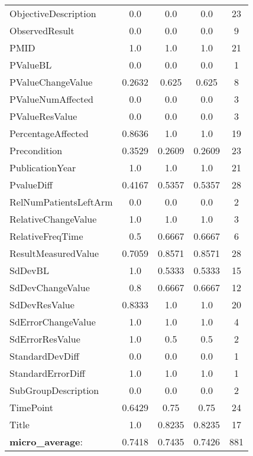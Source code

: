 \begin{longtable}{ l c c c c}
ObjectiveDescription & 0.0 & 0.0 & 0.0 & 23\\
ObservedResult & 0.0 & 0.0 & 0.0 & 9\\
PMID & 1.0 & 1.0 & 1.0 & 21\\
PValueBL & 0.0 & 0.0 & 0.0 & 1\\
PValueChangeValue & 0.2632 & 0.625 & 0.625 & 8\\
PValueNumAffected & 0.0 & 0.0 & 0.0 & 3\\
PValueResValue & 0.0 & 0.0 & 0.0 & 3\\
PercentageAffected & 0.8636 & 1.0 & 1.0 & 19\\
Precondition & 0.3529 & 0.2609 & 0.2609 & 23\\
PublicationYear & 1.0 & 1.0 & 1.0 & 21\\
PvalueDiff & 0.4167 & 0.5357 & 0.5357 & 28\\
RelNumPatientsLeftArm & 0.0 & 0.0 & 0.0 & 2\\
RelativeChangeValue & 1.0 & 1.0 & 1.0 & 3\\
RelativeFreqTime & 0.5 & 0.6667 & 0.6667 & 6\\
ResultMeasuredValue & 0.7059 & 0.8571 & 0.8571 & 28\\
SdDevBL & 1.0 & 0.5333 & 0.5333 & 15\\
SdDevChangeValue & 0.8 & 0.6667 & 0.6667 & 12\\
SdDevResValue & 0.8333 & 1.0 & 1.0 & 20\\
SdErrorChangeValue & 1.0 & 1.0 & 1.0 & 4\\
SdErrorResValue & 1.0 & 0.5 & 0.5 & 2\\
StandardDevDiff & 0.0 & 0.0 & 0.0 & 1\\
StandardErrorDiff & 1.0 & 1.0 & 1.0 & 1\\
SubGroupDescription & 0.0 & 0.0 & 0.0 & 2\\
TimePoint & 0.6429 & 0.75 & 0.75 & 24\\
Title & 1.0 & 0.8235 & 0.8235 & 17\\
\textbf{micro\_average}: & 0.7418 & 0.7435 & 0.7426 & 881 
\label{tab:Glaucoma_eventextr}
\end{longtable}
